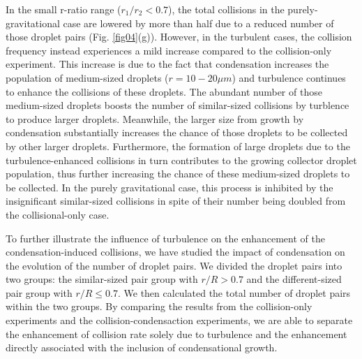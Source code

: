 In the small r-ratio range ($r_1/r_2<0.7$), the total collisions in the purely-gravitational case are lowered by more than half due to a reduced number of those droplet pairs (Fig. \ref{fig04}(g)). However, in the turbulent cases, the collision frequency instead experiences a mild increase compared to the collision-only experiment. This increase is due to the fact that condensation increases the population of medium-sized droplets ($r=10-20 \mu m$) and turbulence continues to enhance the collisions of these droplets. The abundant number of those medium-sized droplets boosts the number of similar-sized collisions by turblence to produce larger droplets. Meanwhile, the larger size from growth by condensation substantially increases the chance of those droplets to be collected by other larger droplets. Furthermore, the formation of large droplets due to the turbulence-enhanced collisions in turn contributes to the growing collector droplet population, thus further increasing the chance of these medium-sized droplets to be collected. In the purely gravitational case, this process is inhibited by the insignificant similar-sized collisions in spite of their number being doubled from the collisional-only case.

To further illustrate the influence of turbulence on the enhancement of the condensation-induced collisions, we have studied the impact of condensation on the evolution of the number of droplet pairs. We divided the droplet pairs into two groups: the similar-sized pair group with $r/R>0.7$ and the different-sized pair group with $r/R \leq 0.7$. We then calculated the total number of droplet pairs within the two groups. By comparing the results from the collision-only experiments and the collision-condensaction experiments, we are able to separate the enhancement of collision rate solely due to turbulence and the enhancement directly associated with the inclusion of condensational growth. 

